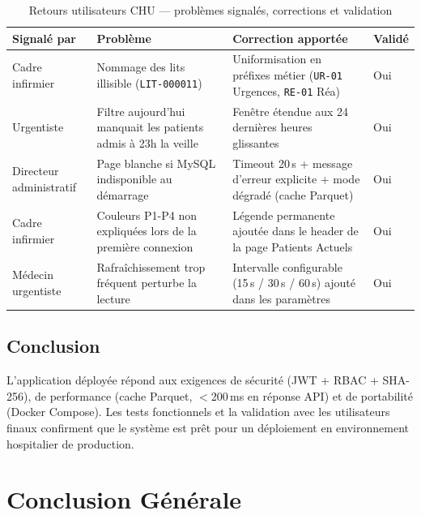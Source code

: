 \documentclass[12pt,a4paper]{report}
\begin{document}
	\begin{table}[H]
		\centering
		\caption{Retours utilisateurs CHU — problèmes signalés, corrections et validation}
		\renewcommand{\arraystretch}{1.3}
		\begin{tabularx}{\textwidth}{lXXl}
			\toprule
			\textbf{Signalé par} & \textbf{Problème} & \textbf{Correction apportée} & \textbf{Validé} \\
			\midrule
			Cadre infirmier
			& Nommage des lits illisible (\texttt{LIT-000011})
			& Uniformisation en préfixes métier (\texttt{UR-01} Urgences, \texttt{RE-01} Réa)
			& Oui \\
			Urgentiste
			& Filtre \og{}aujourd'hui\fg{} manquait les patients admis à 23h la veille
			& Fenêtre étendue aux 24 dernières heures glissantes
			& Oui \\
			Directeur administratif
			& Page blanche si MySQL indisponible au démarrage
			& Timeout 20\,s + message d'erreur explicite + mode dégradé (cache Parquet)
			& Oui \\
			Cadre infirmier
			& Couleurs P1-P4 non expliquées lors de la première connexion
			& Légende permanente ajoutée dans le header de la page Patients Actuels
			& Oui \\
			Médecin urgentiste
			& Rafraîchissement trop fréquent perturbe la lecture
			& Intervalle configurable (15\,s / 30\,s / 60\,s) ajouté dans les paramètres
			& Oui \\
			\bottomrule
		\end{tabularx}
	\end{table}
	
	\section{Conclusion}
	
	L'application déployée répond aux exigences de sécurité (JWT + RBAC + SHA-256),
	de performance (cache Parquet, $<$200\,ms en réponse API) et de portabilité (Docker Compose).
	Les tests fonctionnels et la validation avec les utilisateurs finaux confirment que le
	système est prêt pour un déploiement en environnement hospitalier de production.
	
	\chapter*{Conclusion Générale}
	
\end{document}

